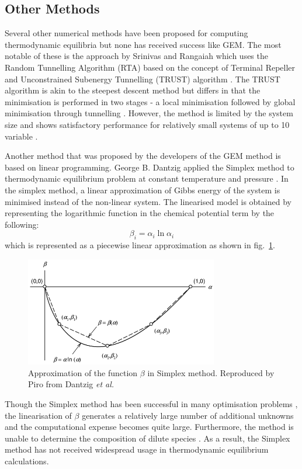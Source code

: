 	\subsection{Other Methods}
	Several other numerical methods have been proposed for computing thermodynamic equilibria but none has received success like GEM. The most notable of these is the approach by Srinivas and Rangaiah which uses  the Random Tunnelling Algorithm (RTA) based on the concept of Terminal Repeller and Unconstrained Subenergy Tunnelling (TRUST) algorithm \cite{Srinivas06}. The TRUST algorithm is akin to the steepest descent method but differs in that the minimisation is performed in two stages - a local minimisation followed by global minimisation through tunnelling \cite{Nocedal06}.  However, the method is limited by the system size and shows satisfactory performance for relatively small systems of up to 10 variable \cite{Nocedal06}.
	
	Another method that was proposed by the developers of the GEM method is based on linear programming. George B. Dantzig applied the Simplex method to thermodynamic equilibrium problem at constant temperature and pressure \cite{Dantzig:1957aa,Dantzig:1958aa}. In the simplex method, a linear approximation of Gibbs energy of the system is minimised instead of the non-linear system. The linearised model is obtained by representing the logarithmic function in the chemical potential term by the following:
	\begin{equation}
		\beta_i = \alpha_i \ln \alpha_i
	\end{equation}
 which is represented as a piecewise linear approximation as shown in fig.~\ref{fig:simplex}.  
 	\begin{figure}[htbp]
		\centering
		\includegraphics[width=0.75\textwidth]{figures/Simplex}
		\caption{Approximation of the function $\beta$ in Simplex method. Reproduced by Piro \cite{Piro11b} from Dantzig \textit{et al.} \cite{Dantzig:1957aa}}
		\label{fig:simplex}
	\end{figure}
	Though the Simplex method has been successful in many optimisation problems \cite{Dantzig:2016aa}, the linearisation of $\beta$ generates a relatively large number of additional unknowns and the computational expense becomes quite large. Furthermore, the method is unable to determine the composition of dilute species \cite{vanZeggeren11}. As a result, the Simplex method has not received widespread usage in thermodynamic equilibrium calculations.  

